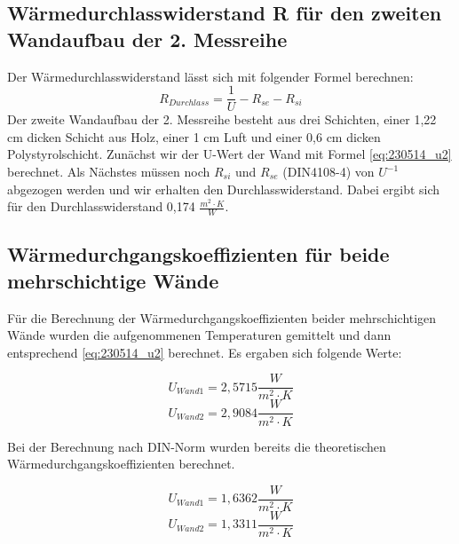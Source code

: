 \subsection{Wärmedurchlasswiderstand R für den zweiten Wandaufbau der 2. Messreihe}
Der Wärmedurchlasswiderstand lässt sich mit folgender Formel berechnen:
%
\begin{equation}
R_{Durchlass}=\frac{1} {U} - R_{se} - R_{si}
  \label{eq:230522_Wärmewiderstand}
\end{equation}
%
Der zweite Wandaufbau der 2. Messreihe besteht aus drei Schichten, einer 1,22 cm dicken Schicht aus Holz, einer 1 cm Luft und einer 0,6 cm dicken Polystyrolschicht. Zunächst wir der U-Wert der Wand mit Formel \ref{eq:230514_u2}  berechnet. Als Nächstes müssen noch $R_{si}$ und $R_{se}$ (DIN4108-4) von  $U^{-1}$ abgezogen werden und wir erhalten den Durchlasswiderstand. Dabei ergibt sich für den Durchlasswiderstand 0,174 $\frac{ m^2 \cdot K }{W}$. 

\newpage
\subsection{Wärmedurchgangskoeffizienten für beide mehrschichtige Wände}
Für die Berechnung der Wärmedurchgangskoeffizienten beider mehrschichtigen Wände wurden die aufgenommenen Temperaturen gemittelt und dann entsprechend \autoref{eq:230514_u2} berechnet.
Es ergaben sich folgende Werte:

\begin{equation*}
  U_{Wand 1} = 2,5715 \frac{W}{m^2 \cdot K}
\end{equation*}
\begin{equation*}
  U_{Wand 2} = 2,9084 \frac{W}{m^2 \cdot K}
\end{equation*}

Bei der Berechnung nach DIN-Norm wurden bereits die theoretischen Wärmedurchgangskoeffizienten
berechnet.

\begin{equation*}
  U_{Wand 1}=1,6362 \frac{W}{m^2 \cdot K}
\end{equation*}
\begin{equation*}
  U_{Wand 2}=1,3311 \frac{W}{m^2 \cdot K}
\end{equation*}

